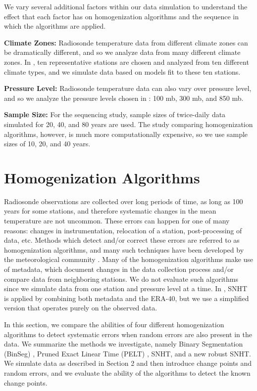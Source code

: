 \documentclass[12pt]{article}
\begin{document}
\begin{doublespacing}
We vary several additional factors within our data simulation to understand the effect that each factor has on homogenization algorithms and the sequence in which the algorithms are applied.

\textbf{Climate Zones:} Radiosonde temperature data from different climate zones can be dramatically different, and so we analyze data from many different climate zones.  In \cite{bell14}, ten representative stations are chosen and analyzed from ten different climate types, and we simulate data based on models fit to these ten stations.

\textbf{Pressure Level:} Radiosonde temperature data can also vary  over pressure level, and so we analyze the pressure levels chosen in \cite{bell14}: 100 mb, 300 mb, and 850 mb.

\textbf{Sample Size:}  For the sequencing study, sample sizes of twice-daily data simulated for 20, 40, and 80 years are used.  The study comparing homogenization algorithms, however, is much more computationally expensive, so we use sample sizes of 10, 20, and 40 years.

\section{Homogenization Algorithms}

Radiosonde observations are collected over long periods of time, as long as 100 years for some stations, and therefore systematic changes in the mean temperature are not uncommon.  These errors can happen for one of many reasons: changes in instrumentation, relocation of a station, post-processing of data, etc.  Methods which detect and/or correct these errors are referred to as homogenization algorithms, and many such techniques have been developed by the meteorological community \cite{alexandersson86, domonkos13, gruber08, haimberger07, lanzante03, li14, lu10, venema12}.  Many of the homogenization algorithms make use of metadata, which document changes in the data collection process and/or compare data from neighboring stations.  We do not evaluate such algorithms since we simulate data from one station and pressure level at a time.  In \cite{haimberger07}, SNHT is applied by combining both metadata and the ERA-40, but we use a simplified version that operates purely on the observed data.

In this section, we compare the abilities of four different homogenization algorithms to detect systematic errors when random errors are also present in the data.  We summarize the methods we investigate, namely Binary Segmentation (BinSeg) \cite{scott74}, Pruned Exact Linear Time (PELT) \cite{killick12}, SNHT, and a new robust SNHT.  We simulate data as described in Section 2 and then introduce change points and random errors, and we evaluate the ability of the algorithms to detect the known change points. 


\end{doublespacing}
\end{document}
